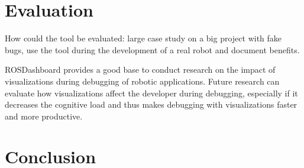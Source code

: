 \section{Evaluation}
How could the tool be evaluated: large case study on a big project with fake bugs, use the tool during the development of a real robot and document benefits.

 ROSDashboard provides a good base to conduct research on the impact of visualizations during debugging of robotic applications. Future research can evaluate how visualizations affect the developer during debugging, especially if it decreases the cognitive load and thus makes debugging with visualizations faster and more productive.

\section{Conclusion}


